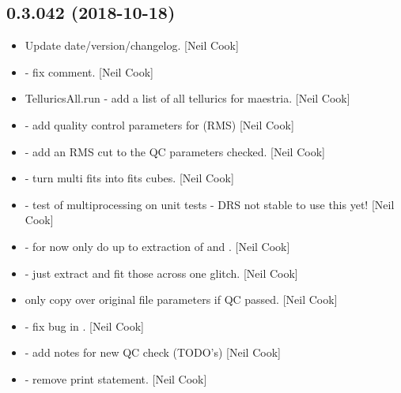 \documentclass[a4paper,10pt,english]{report}
\begin{document}
\subsection{0.3.042 (2018-10-18)}
\label{\detokenize{misc/changelog:id288}}\begin{itemize}
\item {} 
Update date/version/changelog. {[}Neil Cook{]}

\item {} 
 - fix comment. {[}Neil Cook{]}

\item {} 
TelluricsAll.run - add a list of all tellurics for maestria. {[}Neil
Cook{]}

\item {} 
 - add quality control parameters for 
(RMS) {[}Neil Cook{]}

\item {} 
 - add an RMS cut to the QC parameters checked. {[}Neil
Cook{]}

\item {} 
 - turn multi fits into fits cubes. {[}Neil Cook{]}

\item {} 
 - test of multiprocessing on unit tests - DRS
not stable to use this yet! {[}Neil Cook{]}

\item {} 
 - for now only do up to extraction of  and
. {[}Neil Cook{]}

\item {} 
 - just extract and fit those across one glitch. {[}Neil
Cook{]}

\item {} 
 only copy over original file parameters if QC passed.
{[}Neil Cook{]}

\item {} 
 - fix bug in . {[}Neil Cook{]}

\item {} 
 - add notes for new QC check (TODO’s) {[}Neil Cook{]}

\item {} 
 - remove print statement. {[}Neil Cook{]}


\end{itemize}
\end{document}

